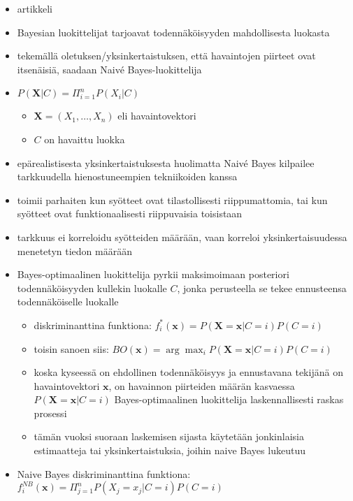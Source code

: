 \begin{itemize}
    \item artikkeli \cite{rish2001empirical}
    \item Bayesian luokittelijat tarjoavat todennäköisyyden mahdollisesta luokasta
    \item tekemällä oletuksen/yksinkertaistuksen, että havaintojen piirteet ovat itsenäisiä, saadaan Naivé Bayes-luokittelija
    \item $P(\textbf{X} | C) = \Pi^n_{i=1} P(X_i|C)$
    \begin{itemize}
        \item $\textbf{X} = (X_1, \dots, X_n)$ eli havaintovektori
        \item $C$ on havaittu luokka
    \end{itemize}
    \item epärealistisesta yksinkertaistuksesta huolimatta Naivé Bayes kilpailee tarkkuudella hienostuneempien tekniikoiden kanssa\cite{rish2001empirical}
    \item toimii parhaiten kun syötteet ovat tilastollisesti riippumattomia, tai kun syötteet ovat funktionaalisesti riippuvaisia toisistaan
    \item tarkkuus ei korreloidu syötteiden määrään, vaan korreloi yksinkertaisuudessa menetetyn tiedon määrään
    \item Bayes-optimaalinen luokittelija pyrkii maksimoimaan posteriori todennäköisyyden kullekin luokalle $C$, jonka perusteella se tekee ennusteensa todennäköiselle luokalle
    \begin{itemize}
        \item diskriminanttina funktiona: $f^*_i(\textbf{x}) = P(\textbf{X}=\textbf{x} | C=i) P(C=i)$
        \item toisin sanoen siis: $BO(\textbf{x}) = \arg \max_i P(\textbf{X} = \textbf{x}|C=i) P(C = i)$
        \item koska kyseessä on ehdollinen todennäköisyys ja ennustavana tekijänä on havaintovektori $\textbf{x}$, on havainnon piirteiden määrän kasvaessa $P(\textbf{X} = \textbf{x} | C = i)$ Bayes-optimaalinen luokittelija laskennallisesti raskas prosessi
        \item tämän vuoksi suoraan laskemisen sijasta käytetään jonkinlaisia estimaatteja tai yksinkertaistuksia, joihin naive Bayes lukeutuu
    \end{itemize}
    \item Naive Bayes diskriminanttina funktiona: $f^{NB}_i(\textbf{x}) = \Pi^n_{j=1} P(X_j=x_j | C=i) P(C=i)$

\end{itemize}
